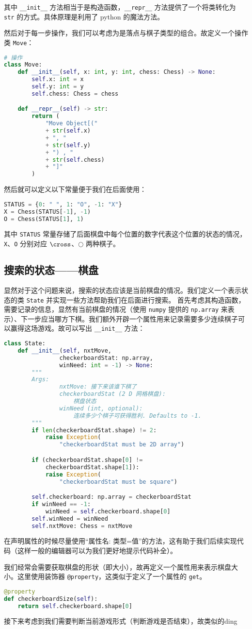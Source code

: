 其中 \verb`__init__` 方法相当于是构造函数，\verb`__repr__` 方法提供了一个将类转化为 \verb`str` 的方式。具体原理是利用了 python 的魔法方法。

然后对于每一步操作，我们可以考虑为是落点与棋子类型的组合。故定义一个操作类 \verb`Move`：
\begin{lstlisting}[language=python]
# 操作
class Move:
    def __init__(self, x: int, y: int, chess: Chess) -> None:
        self.x: int = x
        self.y: int = y
        self.chess: Chess = chess

    def __repr__(self) -> str:
        return (
            "Move Object[("
            + str(self.x)
            + ", "
            + str(self.y)
            + ") , "
            + str(self.chess)
            + "]"
        )
\end{lstlisting}
然后就可以定义以下常量便于我们在后面使用：
\begin{lstlisting}[language=python]
STATUS = {0: " ", 1: "O", -1: "X"}
X = Chess(STATUS[-1], -1)
O = Chess(STATUS[1], 1)
\end{lstlisting}
其中 \verb`STATUS` 常量存储了后面棋盘中每个位置的数字代表这个位置的状态的情况，\verb`X`、\verb`O` 分别对应 $\cross$、$\bigcirc$ 两种棋子。

\subsection{搜索的状态——棋盘}
显然对于这个问题来说，搜索的状态应该是当前棋盘的情况。我们定义一个表示状态的类 \verb`State` 并实现一些方法帮助我们在后面进行搜索。
首先考虑其构造函数，需要记录的信息，显然有当前棋盘的情况（使用 \verb`numpy` 提供的 \verb`np.array` 来表示）、下一步应当哪方下棋。我们额外开辟一个属性用来记录需要多少连续棋子可以赢得这场游戏。故可以写出 \verb`__init__` 方法：
\begin{lstlisting}[language=python]
class State:
    def __init__(self, nxtMove,
                checkerboardStat: np.array,
                winNeed: int = -1) -> None:
        """
        Args:
                nxtMove: 接下来该谁下棋了
                checkerboardStat (2 D 网格棋盘):
                    棋盘状态
                winNeed (int, optional):
                    连续多少个棋子可获得胜利. Defaults to -1.
        """
        if len(checkerboardStat.shape) != 2:
            raise Exception(
                "checkerboardStat must be 2D array")

        if (checkerboardStat.shape[0] !=
            checkerboardStat.shape[1]):
            raise Exception(
                "checkerboardStat must be square")

        self.checkerboard: np.array = checkerboardStat
        if winNeed == -1:
            winNeed = self.checkerboard.shape[0]
        self.winNeed = winNeed
        self.nxtMove: Chess = nxtMove
\end{lstlisting}
在声明属性的时候尽量使用“属性名: 类型=值”的方法，这有助于我们后续实现代码（这样一般的编辑器可以为我们更好地提示代码补全）。

我们经常会需要获取棋盘的形状（即大小），故再定义一个属性用来表示棋盘大小。这里使用装饰器 \verb`@property`，这类似于定义了一个属性的 \verb`get`。
\begin{lstlisting}[language=python]
@property
def checkerboardSize(self):
    return self.checkerboard.shape[0]
\end{lstlisting}

接下来考虑到我们需要判断当前游戏形式（判断游戏是否结束），故类似的ding